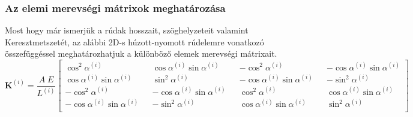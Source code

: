 \documentclass[12pt,a4paper]{article}
\def\mx#1{\mathbf{#1}}
\def\i{\left(i\right)}
\def\cosalfa{\cos \alpha^{\i}}
\def\sinalfa{\sin \alpha^{\i}}
\def\cosalfasq{\cos^2 \alpha^{\i}}
\def\sinalfasq{\sin^2 \alpha^{\i}}
\begin{document}
\subsubsection{Az elemi merevségi mátrixok meghatározása}
Most hogy már ismerjük a rúdak hosszait, szöghelyzeteit valamint Keresztmetszetét,
az alábbi 2D-s húzott-nyomott rúdelemre vonatkozó összefüggéssel meghatározhatjuk a
különböző elemek merevségi mátrixait.
\begin{equation}
    \mx{K}^{\i}=\frac{A \; E}{L^{\i}}
    \begin{bmatrix}
        \cosalfasq          &  & \cosalfa \sinalfa   &  & -\cosalfasq          &  & - \cosalfa  \sinalfa \\
        \cosalfa  \sinalfa  &  & \sinalfasq          &  & - \cosalfa  \sinalfa &  & -\sinalfasq          \\
        -\cosalfasq         &  & -\cosalfa  \sinalfa &  & \cosalfasq           &  & \cosalfa  \sinalfa   \\
        -\cosalfa  \sinalfa &  & -\sinalfasq         &  & \cosalfa  \sinalfa   &  & \sinalfasq           \\
    \end{bmatrix}
\end{equation}
\end{document}
